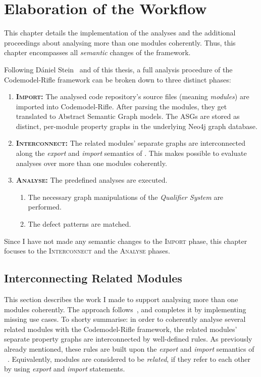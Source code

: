 \chapter{Elaboration of the Workflow}
\label{chapter:elaboration}

This chapter details the implementation of the analyses and the additional proceedings about analysing more than one \es modules coherently. Thus, this chapter encompasses all \emph{semantic} changes of the framework.

Following Dániel Stein~\cite{stein-daniel-msc} and  of this thesis, a full analysis procedure of the Codemodel-Rifle framework can be broken down to three distinct phases:

\begin{enumerate}
\item \textsc{\textbf{Import:}} The analysed code repository's \es source files (meaning \es \emph{modules}) are imported into Codemodel-Rifle. After parsing the modules, they get translated to Abstract Semantic Graph models. The ASGs are stored as distinct, per-module property graphs in the underlying Neo4j graph database.
\item \textsc{\textbf{Interconnect:}} The related modules' separate graphs are interconnected along the \emph{export} and \emph{import} semantics of \es. This makes possible to evaluate analyses over more than one modules coherently.
\item \textsc{\textbf{Analyse:}} The predefined analyses are executed.
	\begin{enumerate}
	\item The necessary graph manipulations of the \emph{Qualifier System} are performed.
	\item The defect patterns are matched.
	\end{enumerate}
\end{enumerate}

Since I have not made any semantic changes to the \textsc{Import} phase, this chapter focuses to the \textsc{Interconnect} and the \textsc{Analyse} phases.


\section{Interconnecting Related \es Modules}

This section describes the work I made to support analysing more than one \es modules coherently. The approach follows~\cite{stein-daniel-msc}, and completes it by implementing missing use cases. To shorty summarise: in order to coherently analyse several related \es modules with the Codemodel-Rifle framework, the related modules' separate property graphs are interconnected by well-defined rules. As previously already mentioned, these rules are built upon the \emph{export} and \emph{import} semantics of \es~\cite{exploringes6}. Equivalently, \es modules are considered to be \emph{related}, if they refer to each other by using \emph{export} and \emph{import} statements.


